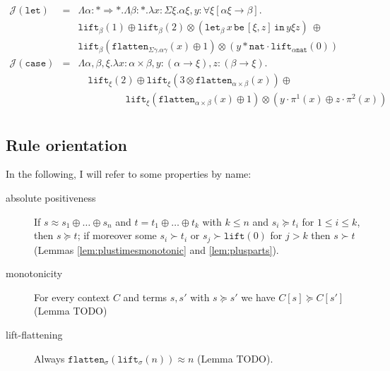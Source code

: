 \documentclass[runningheads,a4paper]{llncs}
\newcommand{\Termmap}{\mathcal{J}}
\newcommand{\quant}[2]{\forall #1[#2]}
\newcommand{\arrtype}{\rightarrow}
\newcommand{\arrkind}{\Rightarrow}
\newcommand{\nat}{\mathtt{nat}}
\newcommand{\flatten}{\mathtt{flatten}}
\newcommand{\lift}{\mathtt{lift}}
\newcommand{\xlet}[4]{\mathtt{let}_{#1}\,#2\,\mathtt{be}\,[#3]\,\mathtt{in}\,#4}
\begin{document}
\[
\begin{array}{rcl}
\Termmap(\mathtt{let}) & = & \Lambda \alpha : * \arrkind * . \Lambda \beta : * . \lambda x : \Sigma \xi . \alpha\xi,
  y : \quant{\xi}{\alpha\xi \arrtype \beta}. \\
  & & \lift_\beta(1) \oplus \lift_\beta(2) \otimes
    (\xlet{\beta}{x}{\xi,z}{y\xi z})\ \oplus \\
  & & \lift_\beta(\flatten_{\Sigma\gamma.\alpha\gamma}(x) \oplus 1)
    \otimes (y * \nat \cdot \lift_{\alpha\nat}(0)) \\
\Termmap(\mathtt{case}) & = & \Lambda \alpha,\beta,\xi . \lambda x :
  \alpha \times \beta, y : (\alpha \arrtype \xi), z : (\beta \arrtype
  \xi). \\
  & & \quad
  \lift_\xi(2) \oplus
  \lift_\xi(3 \otimes \flatten_{\alpha \times \beta}(x)) \oplus \\
  & & \quad\phantom{ABCDE}
  \lift_\xi(\flatten_{\alpha \times \beta}(x) \oplus 1)
    \otimes (y \cdot \pi^1(x) \oplus z \cdot \pi^2(x)) \\
\end{array}
\]

\subsection{Rule orientation}

In the following, I will refer to some properties by name:

\begin{description}
\item[absolute positiveness]
  If $s \approx s_1 \oplus \dots \oplus s_n$ and $t = t_1 \oplus \dots
  \oplus t_k$ with $k \leq n$ and $s_i \succeq t_i$ for $1 \leq i \leq
  k$, then $s \succeq t$; if moreover some $s_i \succ t_i$ or $s_j
  \succ \lift(0)$ for $j > k$ then $s \succ t$ (Lemmas
  \ref{lem:plustimesmonotonic} and \ref{lem:plusparts}).
\item[monotonicity]
  For every context $C$ and terms $s, s'$ with $s \succeq s'$ we have
  $C[s] \succeq C[s']$ (Lemma TODO)
\item[lift-flattening]
  Always $\flatten_\sigma(\lift_\sigma(n)) \approx n$
  (Lemma TODO).
\end{description}
\end{document}
